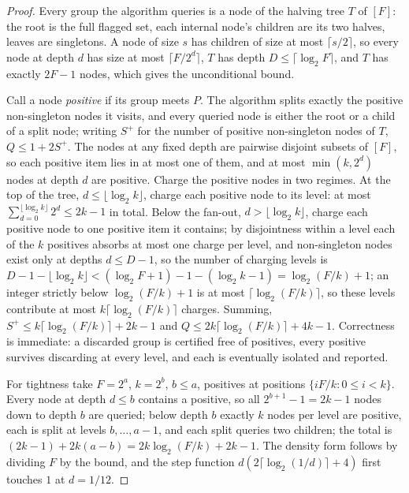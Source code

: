 \documentclass[11pt,a4paper]{article}
\theoremstyle{definition}
\theoremstyle{plain}
\begin{document}
\begin{proof}
\setlength{\parskip}{4pt plus 1pt}
Every group the algorithm queries is a node of the halving tree $T$ of $[F]$: the
root is the full flagged set, each internal node's children are its two halves,
leaves are singletons. A node of size $s$ has children of size at most
$\lceil s/2\rceil$, so every node at depth $d$ has size at most
$\lceil F/2^d\rceil$, $T$ has depth $D\le\lceil\log_2 F\rceil$, and $T$ has exactly
$2F-1$ nodes, which gives the unconditional bound.

Call a node \emph{positive} if its group meets $P$. The algorithm splits exactly
the positive non-singleton nodes it visits, and every queried node is either the
root or a child of a split node; writing $S^{+}$ for the number of positive
non-singleton nodes of $T$, $Q\le 1+2S^{+}$. The nodes at any fixed depth are
pairwise disjoint subsets of $[F]$, so each positive item lies in at most one of
them, and at most $\min(k,2^d)$ nodes at depth $d$ are positive. Charge the
positive nodes in two regimes. At the top of the tree, $d\le\lfloor\log_2 k\rfloor$,
charge each positive node to its level: at most
$\sum_{d=0}^{\lfloor\log_2 k\rfloor}2^d\le 2k-1$ in total. Below the fan-out,
$d>\lfloor\log_2 k\rfloor$, charge each positive node to one positive item it
contains; by disjointness within a level each of the $k$ positives absorbs at most
one charge per level, and non-singleton nodes exist only at depths $d\le D-1$, so
the number of charging levels is
$D-1-\lfloor\log_2 k\rfloor<(\log_2 F+1)-1-(\log_2 k-1)=\log_2(F/k)+1$; an integer
strictly below $\log_2(F/k)+1$ is at most $\lceil\log_2(F/k)\rceil$, so these
levels contribute at most $k\lceil\log_2(F/k)\rceil$ charges. Summing,
$S^{+}\le k\lceil\log_2(F/k)\rceil+2k-1$ and
$Q\le 2k\lceil\log_2(F/k)\rceil+4k-1$. Correctness is immediate: a discarded group
is certified free of positives, every positive survives discarding at every level,
and each is eventually isolated and reported.

For tightness take $F=2^a$, $k=2^b$, $b\le a$, positives at positions
$\{iF/k:0\le i<k\}$. Every node at depth $d\le b$ contains a positive, so all
$2^{b+1}-1=2k-1$ nodes down to depth $b$ are queried; below depth $b$ exactly $k$
nodes per level are positive, each is split at levels $b,\dots,a-1$, and each split
queries two children; the total is $(2k-1)+2k(a-b)=2k\log_2(F/k)+2k-1$. The
density form follows by dividing $F$ by the bound, and the step function
$d(2\lceil\log_2(1/d)\rceil+4)$ first touches $1$ at $d=1/12$.
\end{proof}
\end{document}
